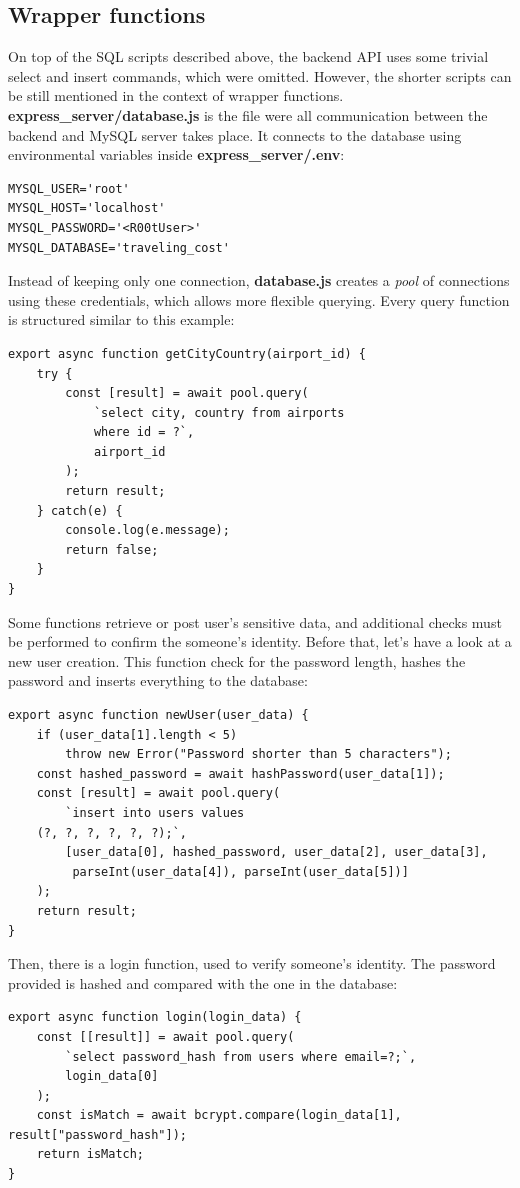 \documentclass[12pt]{article}
\begin{document}
\subsection{Wrapper functions}
\label{sec:orgd21527d}
On top of the SQL scripts described above, the backend API uses some trivial select and insert commands, which were omitted. However, the shorter scripts can be still mentioned in the context of wrapper functions. \textbf{express\_server/database.js} is the file were all communication between the backend and MySQL server takes place. It connects to the database using environmental variables inside \textbf{express\_server/.env}:
\begin{verbatim}
MYSQL_USER='root'
MYSQL_HOST='localhost'
MYSQL_PASSWORD='<R00tUser>'
MYSQL_DATABASE='traveling_cost'
\end{verbatim}
Instead of keeping only one connection, \textbf{database.js} creates a \emph{pool} of connections using these credentials, which allows more flexible querying. Every query function is structured similar to this example:
\begin{verbatim}
export async function getCityCountry(airport_id) {
	try {
		const [result] = await pool.query(
			`select city, country from airports
			where id = ?`,
			airport_id
		);
		return result;
	} catch(e) {
		console.log(e.message);
		return false;
	}  	
}
\end{verbatim}
Some functions retrieve or post user's sensitive data, and additional checks must be performed to confirm the someone's identity. Before that, let's have a look at a new user creation. This function check for the password length, hashes the password and inserts everything to the database:
\begin{verbatim}
export async function newUser(user_data) {
	if (user_data[1].length < 5)
		throw new Error("Password shorter than 5 characters");
	const hashed_password = await hashPassword(user_data[1]);
	const [result] = await pool.query(
		`insert into users values
	(?, ?, ?, ?, ?, ?);`,
		[user_data[0], hashed_password, user_data[2], user_data[3],
		 parseInt(user_data[4]), parseInt(user_data[5])]
	);
	return result;
}
\end{verbatim}
Then, there is a login function, used to verify someone's identity. The password provided is hashed and compared with the one in the database:
\begin{verbatim}
export async function login(login_data) {
	const [[result]] = await pool.query(
		`select password_hash from users where email=?;`,
		login_data[0]
	);
	const isMatch = await bcrypt.compare(login_data[1], result["password_hash"]);
	return isMatch;
}
\end{verbatim}
\end{document}
